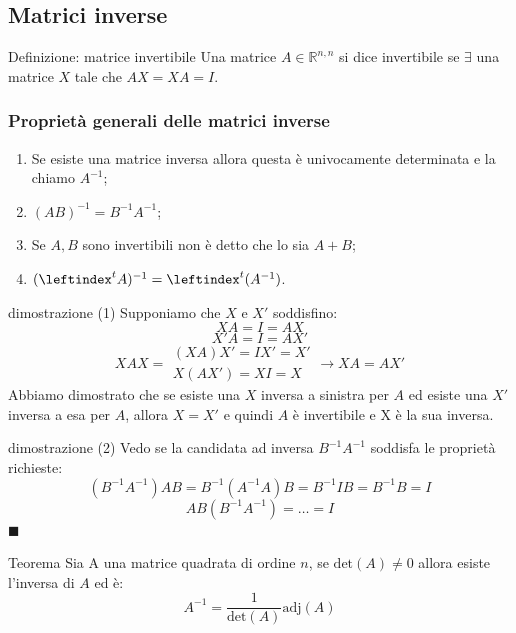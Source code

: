 \documentclass[x11names]{article}
\newcommand*{\QEDA}{\null\nobreak\hfill\ensuremath{\blacksquare}}%
\begin{document}
\subsection{Matrici inverse}
\begin{center}
\colorbox{myblue}{\begin{minipage}{5.75in}
\begin{blues}{Definizione: matrice invertibile}
    Una matrice $A \in \mathbb{R}^{n,n}$ si dice invertibile se $\exists$ una matrice $X$ tale che $AX = XA = I$.
\end{blues}
\end{minipage}}        
\end{center}
\subsubsection*{Proprietà generali delle matrici inverse}
\begin{enumerate}
    \item Se esiste una matrice inversa allora questa è univocamente determinata e la chiamo $A^{-1}$;
    \item $(AB)^{-1} = B^{-1}A^{-1}$;
    \item Se $A,B$ sono invertibili non è detto che lo sia $A+B$;
    \item $(\leftindex ^t{A})^{-1} = \leftindex ^t(A^{-1})$.
\end{enumerate}



\begin{es}{dimostrazione (1)}
Supponiamo che $X$ e $X'$ soddisfino:
$$
XA = I = AX 
$$
$$
X' A = I = AX'
$$
$$
XAX = \begin{array}{c}
       (XA)X' = IX' = X' \\
       X(AX') = XI = X
    \end{array}
    \rightarrow
    XA = AX'
$$
Abbiamo dimostrato che se esiste una $X$ inversa a sinistra per $A$ ed esiste una $X' $ inversa a esa per $A$, allora $X=X'$ e quindi $A$ è invertibile e X è la sua inversa.
\end{es}
\begin{es}{dimostrazione (2)}
Vedo se la candidata ad inversa $B^{-1}A^{-1}$ soddisfa le proprietà richieste:
$$
(B^{-1}A^{-1})AB = B^{-1}(A^{-1}A)B = B^{-1}IB = B^{-1}B = I
$$
$$
AB(B^{-1}A^{-1})= \dots = I
$$
\QEDA
\end{es}

\begin{center}
\colorbox{myred}{
\begin{minipage}{5.75in}
\begin{redes}{Teorema}
Sia A una matrice quadrata di ordine $n$, se $\text{det}(A) \neq 0$ allora esiste l’inversa di $A$ ed è:
\[
A^{-1} = \frac{1}{\text{det}(A)}\text{adj}(A)
\]
\end{redes}
\end{minipage}}
\end{center}
\end{document}
